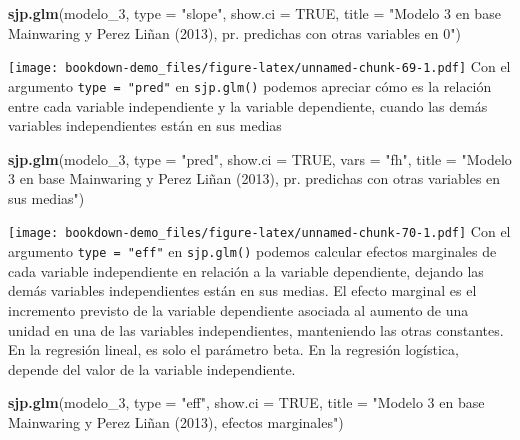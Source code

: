 \documentclass[]{book}
\newenvironment{Shaded}{\begin{snugshade}}{\end{snugshade}}
\newcommand{\KeywordTok}[1]{\textcolor[rgb]{0.13,0.29,0.53}{\textbf{#1}}}
\newcommand{\DataTypeTok}[1]{\textcolor[rgb]{0.13,0.29,0.53}{#1}}
\newcommand{\DecValTok}[1]{\textcolor[rgb]{0.00,0.00,0.81}{#1}}
\newcommand{\StringTok}[1]{\textcolor[rgb]{0.31,0.60,0.02}{#1}}
\newcommand{\OtherTok}[1]{\textcolor[rgb]{0.56,0.35,0.01}{#1}}
\newcommand{\NormalTok}[1]{#1}
\begin{document}
\begin{Shaded}
\begin{Highlighting}[]
\KeywordTok{sjp.glm}\NormalTok{(modelo_}\DecValTok{3}\NormalTok{,}
        \DataTypeTok{type        =} \StringTok{"slope"}\NormalTok{,}
        \DataTypeTok{show.ci     =} \OtherTok{TRUE}\NormalTok{,}
        \DataTypeTok{title       =} \StringTok{"Modelo 3 en base Mainwaring y Perez Liñan (2013), pr. predichas con otras variables en 0"}\NormalTok{)}
\end{Highlighting}
\end{Shaded}

\texttt{[image: bookdown-demo\_files/figure-latex/unnamed-chunk-69-1.pdf]}
Con el argumento \texttt{type\ =\ "pred"} en \texttt{sjp.glm()} podemos
apreciar cómo es la relación entre cada variable independiente y la
variable dependiente, cuando las demás variables independientes están en
sus medias

\begin{Shaded}
\begin{Highlighting}[]
\KeywordTok{sjp.glm}\NormalTok{(modelo_}\DecValTok{3}\NormalTok{, }
        \DataTypeTok{type        =} \StringTok{"pred"}\NormalTok{,}
        \DataTypeTok{show.ci     =} \OtherTok{TRUE}\NormalTok{,}
        \DataTypeTok{vars        =} \StringTok{"fh"}\NormalTok{,}
        \DataTypeTok{title       =} \StringTok{"Modelo 3 en base Mainwaring y Perez Liñan (2013), pr. predichas con otras variables en sus medias"}\NormalTok{)}
\end{Highlighting}
\end{Shaded}

\texttt{[image: bookdown-demo\_files/figure-latex/unnamed-chunk-70-1.pdf]}
Con el argumento \texttt{type\ =\ "eff"} en \texttt{sjp.glm()} podemos
calcular efectos marginales de cada variable independiente en relación a
la variable dependiente, dejando las demás variables independientes
están en sus medias. El efecto marginal es el incremento previsto de la
variable dependiente asociada al aumento de una unidad en una de las
variables independientes, manteniendo las otras constantes. En la
regresión lineal, es solo el parámetro beta. En la regresión logística,
depende del valor de la variable independiente.

\begin{Shaded}
\begin{Highlighting}[]
\KeywordTok{sjp.glm}\NormalTok{(modelo_}\DecValTok{3}\NormalTok{, }
        \DataTypeTok{type        =} \StringTok{"eff"}\NormalTok{,}
        \DataTypeTok{show.ci     =} \OtherTok{TRUE}\NormalTok{,}
        \DataTypeTok{title       =} \StringTok{"Modelo 3 en base Mainwaring y Perez Liñan (2013), efectos marginales"}\NormalTok{)}
\end{Highlighting}
\end{Shaded}
\end{document}

